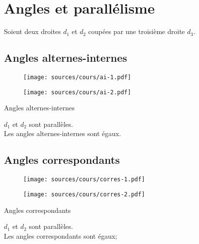\documentclass[paper=a4, fontsize=10pt]{scrartcl} %
\begin{document}
\section{Angles et parallélisme}

Soient deux droites $d_1$ et $d_2$ coupées par une troisième droite $d_3$.
\subsection{Angles alternes-internes}
\begin{multicols}{2}
  \begin{figure}[H]
    \centering
    \texttt{[image: sources/cours/ai-1.pdf]}
  \end{figure}
  \begin{figure}[H]
    \centering
    \texttt{[image: sources/cours/ai-2.pdf]}
  \end{figure}
\end{multicols}
\begin{multicols}{2}
  \begin{Definition}{Angles alternes-internes}\\
  \end{Definition}

  \begin{Proposition}{$d_1$ et $d_2$ sont parallèles.}\\
    Les angles alternes-internes sont égaux.
  \end{Proposition}
\end{multicols}
\subsection{Angles correspondants}
\begin{multicols}{2}
  \begin{figure}[H]
    \centering
    \texttt{[image: sources/cours/corres-1.pdf]}
  \end{figure}
  \begin{figure}[H]
    \centering
    \texttt{[image: sources/cours/corres-2.pdf]}
  \end{figure}
\end{multicols}

\begin{multicols}{2}
  \begin{Definition}{Angles correspondants}\\
  \end{Definition}

  \begin{Proposition}{$d_1$ et $d_2$ sont parallèles.}\\
    Les angles correspondants sont égaux;
  \end{Proposition}
\end{multicols}
\end{document}
